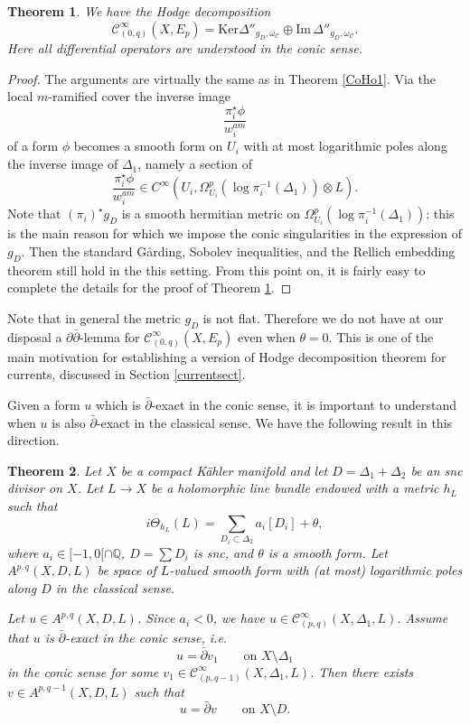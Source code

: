 \documentclass[english]{amsart}
\newcommand{\ddbar}{\partial\bar{\partial}}
\newcommand{\cC}{\mathcal{C}}
\newcommand{\Imm}{\mathrm{Im} \,}
\newcommand{\Ker}{\mathrm{Ker}}
\newcommand{\dbar}{\bar \partial}
\newtheorem{thm}{Theorem}[section]
\numberwithin{equation}{thm}
\begin{document}
\begin{thm}\label{CoHo2}
	We have the Hodge decomposition
	\[
	\cC^\infty_{(0,q)}(X,E_p)
	= \Ker \Delta''_{g_D,\omega_{\cC}} \oplus \Imm \Delta''_{g_D,\omega_{\cC}}.
	\]
	Here all differential operators are understood in the conic sense.
\end{thm}

\begin{proof}
	The arguments are virtually the same as in Theorem \ref{CoHo1}. Via the local $m$-ramified cover the inverse image 
	$$\frac{\pi_i^\star \phi}{w_i^{am}}$$
	of a form $\phi$ becomes a smooth form on $U_i$ with at most logarithmic poles along the inverse image of $\Delta_1$, namely a section of 
	$$\frac{\pi_i^\star \phi}{w_i^{am}} \in C^\infty (U_i, \Omega^p _{U_i} (\log \pi_i ^{-1}(\Delta_1)) \otimes L).$$ Note that $(\pi_i)^\star g_D$ is a smooth hermitian metric on $ \Omega^p _{U_i} (\log \pi_i ^{-1}(\Delta_1))$: this is the main reason for which we impose the conic singularities in the expression of $g_D$.  Then the standard G{\aa}rding, Sobolev inequalities, and the Rellich embedding theorem still hold in the this setting. From this point on, it is fairly easy to complete the details for the proof of Theorem \ref{CoHo2}.
	
	\end{proof}

Note that in general the metric $g_D$ is not flat. Therefore we do not have at our disposal a $\ddbar$-lemma for $\cC^\infty_{(0,q)}(X,E_p)$ even when $\theta=0$. 
This is one of the main motivation for establishing a version of Hodge decomposition theorem for currents, discussed in Section \ref{currentsect}.

\medskip

Given a form $u$ which is $\dbar$-exact in the conic sense, it is important to understand when $u$ is also $\dbar$-exact in the classical sense. 
We have the following result in this direction.

\begin{thm}\label{classsol}
	Let $X$ be a compact K\"ahler manifold and let $D=\Delta_1+\Delta_2$ be an snc divisor on $X$.
	Let $L\to X$ be a holomorphic line bundle endowed with a metric $h_L$ such that
	\[
	i\Theta_{h_L}(L)=\sum_{D_i\subset \Delta_2} a_i [D_i]+\theta,
	\]
	where $a_i\in [-1,0[\cap \mathbb Q$, $D=\sum D_i$ is snc, and $\theta$ is a smooth form.
	Let $A^{p,q}(X,D,L)$  be space of $L$-valued smooth form with (at most) logarithmic poles along $D$ in the classical sense.
	
	Let $u\in A^{p,q}(X,D,L)$. Since $a_i<0$, we have $u\in \cC^\infty_{(p,q)}(X,\Delta_1,L)$.
	Assume that $u$ is $\dbar$-exact in the conic sense, i.e.\
	\[
	u=\dbar v_1 \qquad \text{on } X\setminus \Delta_1
	\]
	in the conic sense for some $v_1\in \cC^\infty_{(p,q-1)}(X,\Delta_1,L)$.
	Then there exists $v\in A^{p,q-1}(X,D,L)$ such that
	\[
	u=\dbar v \qquad \text{on } X\setminus D.
	\]
\end{thm}
\end{document}
